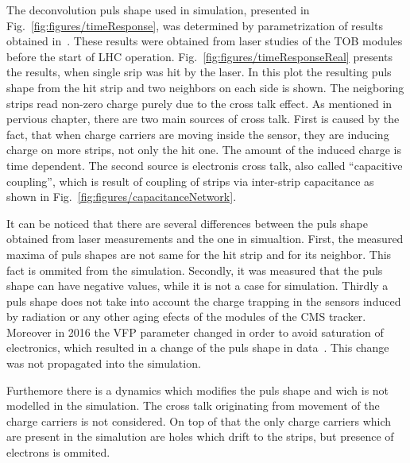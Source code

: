 The deconvolution puls shape used in simulation, presented in Fig.~\ref{fig:figures/timeResponse}, was determined by parametrization of results obtained in~\cite{Delaere:1061284}. These results were obtained from laser studies of the TOB modules before the start of LHC operation. Fig.~\ref{fig:figures/timeResponseReal} presents the results, when single srip was hit by the laser. In this plot the resulting puls shape from the hit strip and two neighbors on each side is shown. The neigboring strips read non-zero charge purely due to the cross talk effect. As mentioned in pervious chapter, there are two main sources of cross talk. First is caused by the fact, that when charge carriers are moving inside the sensor, they are inducing charge on more strips, not only the hit one. The amount of the induced charge is time dependent. The second source is electronis cross talk, also called ``capacitive coupling'', which is result of coupling of strips via inter-strip capacitance as shown in Fig.~\ref{fig:figures/capacitanceNetwork}. 


It can be noticed that there are several differences between the puls shape obtained from laser measurements and the one in simualtion. First, the measured maxima of puls shapes are not same for the hit strip and for its neighbor. This fact is ommited from the simulation. Secondly, it was measured that the puls shape can have negative values, while it is not a case for simulation. Thirdly a puls shape does not take into account the charge trapping in the sensors induced by radiation or any other aging efects of the modules of the CMS tracker. Moreover in 2016 the VFP parameter changed in order to avoid saturation of electronics, which resulted in a change of the puls shape in data~\cite{website:vfp}. This change was not propagated into the simulation.

Furthemore there is a dynamics which modifies the puls shape and wich is not modelled in the simulation. The cross talk originating from movement of the charge carriers is not considered. On top of that the only charge carriers which are present in the simalution are holes which drift to the strips, but presence of electrons is ommited.

